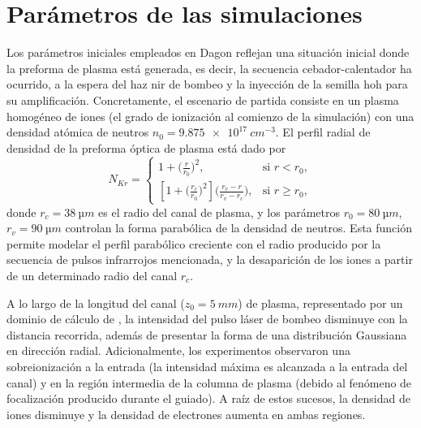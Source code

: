 \section{Parámetros de las simulaciones}\label{sec:3.4}
Los parámetros iniciales empleados en Dagon reflejan una situación inicial donde la preforma de plasma está generada, es decir, la secuencia cebador-calentador ha ocurrido, a la espera del haz \acrshort{nir} de bombeo y la inyección de la semilla \acrshort{hoh} para su amplificación. Concretamente, el escenario de partida consiste en un plasma homogéneo de iones  (el grado de ionización al comienzo de la simulación) con una densidad atómica de neutros $n_{0} = \qty{9.875e17}{cm^{-3}}$. El perfil radial de densidad de la preforma óptica de plasma está dado por
\begin{equation}\label{eq:3.18}
  N_{Kr} =   
  \begin{cases}
    1 + \Big(\frac{r}{r_{0}}\Big)^{2}, & \text{si $r<r_{0}$},\\
    \left[1 + \Big(\frac{r_{c}}{r_{0}}\Big)^{2}\right]\Big(\frac{r_{v}-r}{r_{v}-r_{c}}\Big), & \text{si $r\ge r_{0}$},
  \end{cases}
\end{equation}
donde $r_{c} = \qty{38}{µm}$ es el radio del canal de plasma, y los parámetros $r_{0} = \qty{80}{µm}$, $r_{v} = \qty{90}{µm}$ controlan la forma parabólica de la densidad de neutros. Esta función permite modelar el perfil parabólico creciente con el radio producido por la secuencia de pulsos infrarrojos mencionada, y la desaparición de los iones a partir de un determinado radio del canal $r_{c}$.

A lo largo de la longitud del canal ($z_{0} = \qty{5}{mm}$) de plasma, representado por un dominio de cálculo de , la intensidad del pulso láser de bombeo disminuye con la distancia recorrida, además de presentar la forma de una distribución Gaussiana en dirección radial. Adicionalmente, los experimentos observaron una sobreionización\autocite{Tuitje2020} a la entrada (la intensidad máxima es alcanzada a la entrada del canal) y en la región intermedia de la columna de plasma (debido al fenómeno de focalización producido durante el guiado). A raíz de estos sucesos, la densidad de iones  disminuye y la densidad de electrones aumenta en ambas regiones.


